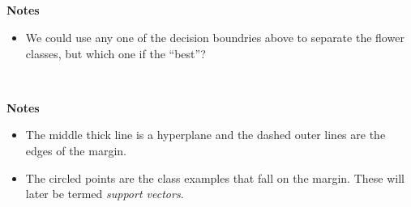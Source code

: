 \documentclass[11pt]{article}
\providecommand{\tightlist}{%
      \setlength{\itemsep}{0pt}\setlength{\parskip}{0pt}}
\begin{document}
    \begin{center}
    \end{center}
    { \hspace*{\fill} \\}
    
    \begin{center}
    \end{center}
    { \hspace*{\fill} \\}
    
    \begin{center}
    \end{center}
    { \hspace*{\fill} \\}
    
    \begin{center}
    \end{center}
    { \hspace*{\fill} \\}
    
    \textbf{Notes}

\begin{itemize}
\tightlist
\item
  We could use any one of the decision boundries above to separate the
  flower classes, but which one if the ``best''?
\end{itemize}

    \begin{center}
    \end{center}
    { \hspace*{\fill} \\}
    
    \textbf{Notes}

\begin{itemize}
\tightlist
\item
  The middle thick line is a {hyperplane} and the dashed outer lines are
  the edges of the {margin}.
\item
  The circled points are the class examples that fall on the margin.
  These will later be termed \emph{support vectors}.
\end{itemize}
\end{document}
